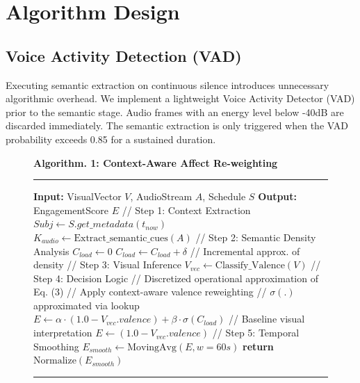 \documentclass[conference]{IEEEtran}
\providecommand{\RETURN}{\STATE \textbf{return} }
\begin{document}
\section{Algorithm Design}

\subsection{Voice Activity Detection (VAD)}
Executing semantic extraction on continuous silence introduces unnecessary algorithmic overhead. We implement a lightweight Voice Activity Detector (VAD) prior to the semantic stage. Audio frames with an energy level below -40dB are discarded immediately. The semantic extraction is only triggered when the VAD probability exceeds 0.85 for a sustained duration.

\begin{figure}[t!]
\centering
\vspace{0.2cm}
\textbf{Algorithm. 1: Context-Aware Affect Re-weighting}
\hrule
\vspace{0.1cm}
\begin{algorithmic}[1]
\small
\STATE \textbf{Input:} VisualVector $V$, AudioStream $A$, Schedule $S$
\STATE \textbf{Output:} EngagementScore $E$
\STATE // Step 1: Context Extraction
\STATE $Subj \leftarrow S.get\_metadata(t_{now})$
\STATE $K_{audio} \leftarrow \text{Extract\_semantic\_cues}(A)$
\STATE
\STATE // Step 2: Semantic Density Analysis
\STATE $C_{load} \leftarrow 0$
    \STATE $C_{load} \leftarrow C_{load} + \delta$ // Incremental approx. of density
\ENDIF
\STATE
\STATE // Step 3: Visual Inference
\STATE $V_{vec} \leftarrow \text{Classify\_Valence}(V)$
\STATE
\STATE // Step 4: Decision Logic
\STATE // Discretized operational approximation of Eq. (3)
    \STATE // Apply context-aware valence reweighting
    \STATE // $\sigma(.)$ approximated via lookup
    \STATE $E \leftarrow \alpha \cdot (1.0 - V_{vec}.valence) + \beta \cdot \sigma(C_{load})$
\ELSE
    \STATE // Baseline visual interpretation
    \STATE $E \leftarrow (1.0 - V_{vec}.valence)$
\ENDIF
\STATE
\STATE // Step 5: Temporal Smoothing
\STATE $E_{smooth} \leftarrow \text{MovingAvg}(E, w=60s)$
\RETURN $\text{Normalize}(E_{smooth})$
\end{algorithmic}
\hrule
\label{alg:context}
\end{figure}
\end{document}
